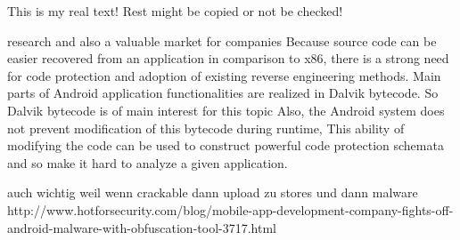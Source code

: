 This is my real text! Rest might be copied or not be checked!



%
research and also a valuable market for companies\newline
Because source code can be easier recovered from an application in comparison
to x86, there is a strong need for code protection and adoption of existing reverse engineering methods. Main parts of Android application functionalities are realized in Dalvik bytecode. So Dalvik bytecode is of main interest for this topic\newline
Also, the Android system does not prevent modification of this bytecode during runtime, This ability of modifying the code can be used to construct
powerful code protection schemata and so make it hard to analyze a given application.\newline
\cite{schulzLabCourse}
%


auch wichtig weil wenn crackable dann upload zu stores und dann malware \newline
http://www.hotforsecurity.com/blog/mobile-app-development-company-fights-off-android-malware-with-obfuscation-tool-3717.html\newline
